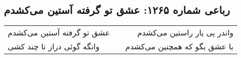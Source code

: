 \begin{center}
\section*{رباعی شماره ۱۲۶۵: عشق تو گرفته آستین می‌کشدم}
\label{sec:1265}
\begin{longtable}{l p{0.5cm} r}
عشق تو گرفته آستین می‌کشدم
&&
واندر پی یار راستین می‌کشدم
\\
وانگه گوئی دراز تا چند کشی
&&
با عشق بگو که همچنین می‌کشدم
\\
\end{longtable}
\end{center}
